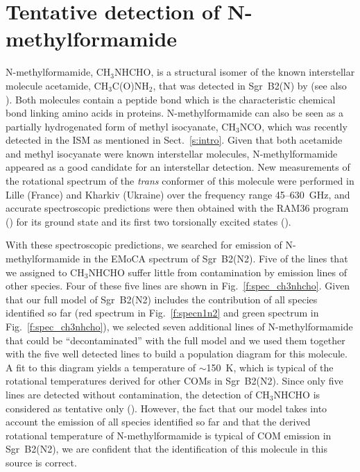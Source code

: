 \documentclass{iau}
\begin{document}
\section{Tentative detection of N-methylformamide}
\label{s:ch3nhcho}

N-methylformamide, CH$_3$NHCHO, is a structural isomer of the known 
interstellar molecule acetamide, CH$_3$C(O)NH$_2$, that was detected in 
Sgr~B2(N) by \cite{Hollis06} (see also \cite{Halfen11}). Both molecules contain
a peptide bond which is the characteristic chemical bond linking amino acids 
in proteins. N-methylformamide can also be seen as a partially hydrogenated
form of methyl isocyanate, CH$_3$NCO, which was recently detected in the ISM
as mentioned in Sect.~\ref{s:intro}. Given that both acetamide and methyl 
isocyanate were known interstellar molecules, N-methylformamide appeared as
a good candidate for an interstellar detection. New measurements of the 
rotational spectrum of the \textit{trans} conformer of this molecule were 
performed in Lille (France) and Kharkiv (Ukraine) over the frequency range
45--630~GHz, and accurate spectroscopic predictions were then obtained 
with the RAM36 program (\cite{Ilyushin10}) for its ground state and its first 
two torsionally excited states (\cite{Belloche17}).

With these spectroscopic predictions, we searched for emission of 
N-methylformamide in the EMoCA spectrum of Sgr~B2(N2). Five of the lines that
we assigned to CH$_3$NHCHO suffer little from contamination by emission
lines of other species. Four of these five lines are shown in 
Fig.~\ref{f:spec_ch3nhcho}. Given that our full model of Sgr~B2(N2) includes 
the contribution of all species identified so far (red spectrum in 
Fig.~\ref{f:specn1n2} and green spectrum in Fig.~\ref{f:spec_ch3nhcho}), we 
selected seven additional lines of N-methylformamide that could be 
``decontaminated'' with the full model and we used them together with the five 
well detected lines to build a population diagram for this molecule. A fit to 
this diagram yields a temperature of $\sim$150~K, which is typical of the 
rotational 
temperatures derived for other COMs in Sgr~B2(N2). Since only five lines are
detected without contamination, the detection of CH$_3$NHCHO is considered
as tentative only (\cite{Belloche17}). However, the fact that our model takes
into account the emission of all species identified so far and that the 
derived rotational temperature of N-methylformamide is typical of COM emission 
in Sgr~B2(N2), we are confident that the identification of this molecule in 
this source is correct.
\end{document}
